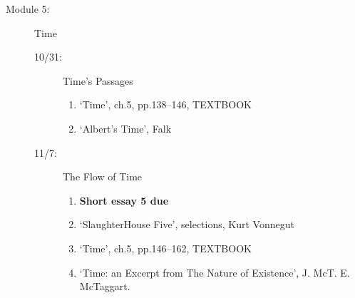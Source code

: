 \documentclass[article,oneside]{memoir}
\begin{document}
\begin{description}
\item[Module 5:] Time 
\begin{description}
\item [10/31:] Time's Passages
\begin{enumerate}
\item `Time', ch.5, pp.138--146, TEXTBOOK
\item `Albert's Time', Falk
\end{enumerate}

\item[11/7:] The Flow of Time
\begin{enumerate}
\item \textbf{Short essay 5 due}
\item `SlaughterHouse Five', selections, Kurt Vonnegut
\item `Time', ch.5, pp.146--162, TEXTBOOK
\item `Time: an Excerpt from The Nature of Existence', J. McT. E. McTaggart.
\end{enumerate}
\end{description}


\end{description}
\end{document}
